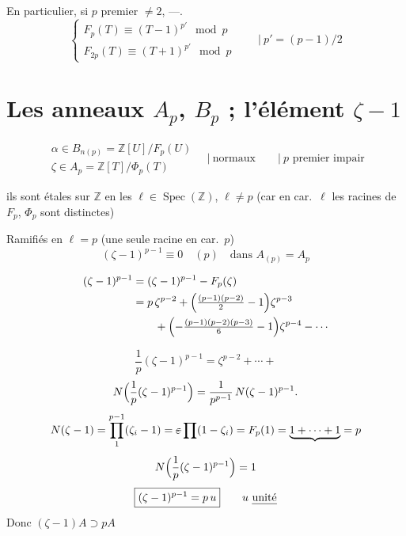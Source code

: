 \documentclass[11pt,a4paper]{article}
\begin{document}
En particulier, si $p$ premier $\neq 2$, ---.
\[
\begin{cases}
F_p(T) \equiv (T-1)^{p'} \mod p\\
F_{2p}(T) \equiv (T+1)^{p'} \mod p
\end{cases}
\qquad \Big|\ p' = (p-1)/2
\]

\section{Les anneaux $A_p$, $B_p$ ; l'élément $\zeta-1$}

\[
\begin{array}{l}
\alpha\in B_{n(p)} = \mathbb{Z}[U]/F_p(U)\\
\zeta\in A_p = \mathbb{Z}[T]/\Phi_p(T)
\end{array}
\quad\Big|\ \text{normaux} \qquad \Big|\ p \text{ premier impair}
\]

ils sont étales sur $\mathbb{Z}$ en les \struck{\ill{}} $\ell\in\operatorname{Spec}(\mathbb{Z})$, $\ell\neq p$ (car en car.\ $\ell$ les racines de $F_p$, $\Phi_p$ sont distinctes)

Ramifiés en $\ell=p$ (une seule racine en car.\ $p$)
\[
(\zeta-1)^{p-1} \equiv 0 \quad (p) \quad\text{dans } A_{(p)} = A_p
\]

\[
\begin{aligned}
(\zeta-1)^{p-1} &= (\zeta-1)^{p-1} - F_p(\zeta)\\
&= p\,\zeta^{p-2} + \Bigl(\tfrac{(p-1)(p-2)}{2}-1\Bigr)\zeta^{p-3}\\
&\qquad + \Bigl(-\tfrac{(p-1)(p-2)(p-3)}{6}-1\Bigr)\zeta^{p-4} - \cdots
\end{aligned}
\]

\[
\frac1p(\zeta-1)^{p-1} = \zeta^{p-2} + \cdots +
\]
\[
N\Bigl(\frac1p(\zeta-1)^{p-1}\Bigr) = \frac{1}{p^{p-1}}\, N(\zeta-1)^{p-1}.
\]
\[
N(\zeta-1) = \prod_1^{p-1}(\zeta_i-1) = \text{\struck{$\varepsilon$}}\prod(1-\zeta_i) = F_p(1) = \underbrace{1+\cdots+1}_{} = p
\]
\[
N\Bigl(\frac1p(\zeta-1)^{p-1}\Bigr) = 1
\]
\[
\boxed{(\zeta-1)^{p-1} = p\,u} \qquad u \text{ \emph{unité}}
\]
Donc $(\zeta-1)A \supset pA$ \quad {}
\end{document}
